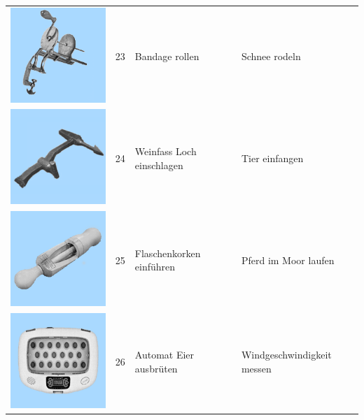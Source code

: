 \documentclass[
  english,
  doc,12pt,twoside,floatsintext]{apa7}
\begin{document}
\begin{center}
\begin{ThreePartTable}
\begin{longtable}{llll}
\includegraphics[valign=c, scale=0.19]{../materials/unfamiliar/23.png} & 23 & Bandage rollen & Schnee rodeln\\
\includegraphics[valign=c, scale=0.19]{../materials/unfamiliar/24.png} & 24 & Weinfass Loch einschlagen & Tier einfangen\\
\includegraphics[valign=c, scale=0.19]{../materials/unfamiliar/25.png} & 25 & Flaschenkorken einführen & Pferd im Moor laufen\\
\includegraphics[valign=c, scale=0.19]{../materials/unfamiliar/26.png} & 26 & Automat Eier ausbrüten & Windgeschwindigkeit messen\\

\end{longtable}
\end{ThreePartTable}
\end{center}
\end{document}
